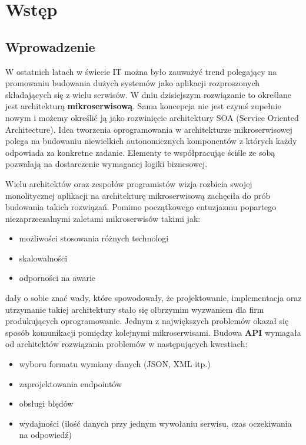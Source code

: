 \chapter{Wstęp}
\section{Wprowadzenie}
W ostatnich latach w świecie IT można było zauważyć trend polegający na promowaniu budowania dużych systemów jako aplikacji rozproszonych składających się z wielu serwisów. W dniu dzisiejszym rozwiązanie to określane jest architekturą \textbf{mikroserwisową}. Sama koncepcja nie jest 
czymś zupełnie nowym i możemy określić ją jako rozwinięcie architektury SOA (Service Oriented Architecture). Idea tworzenia oprogramowania w architekturze mikroserwisowej polega na budowaniu niewielkich autonomicznych komponentów z których każdy odpowiada za konkretne zadanie. Elementy te współpracując ściśle ze sobą pozwalają na dostarczenie wymaganej logiki biznesowej. \par Wielu architektów oraz zespołów programistów wizja rozbicia swojej monolitycznej aplikacji na architekturę mikroserwisową zachęciła do prób budowania takich rozwiązań. Pomimo początkowego entuzjazmu popartego niezaprzeczalnymi zaletami mikroserwisów takimi jak:
\begin{itemize}
    \item możliwości stosowania różnych technologi
    \item skalowalności
    \item odporności na awarie
\end{itemize}
dały o sobie znać wady, które spowodowały, że projektowanie, implementacja oraz utrzymanie takiej architektury stało się olbrzymim wyzwaniem dla firm produkujących oprogramowanie. Jednym z największych problemów okazał się sposób komunikacji pomiędzy kolejnymi mikroserwisami. Budowa \textbf{API} wymagała od architektów rozwiązania problemów w następujących kwestiach:
\begin{itemize}
    \item wyboru formatu wymiany danych (JSON, XML itp.)
    \item zaprojektowania endpointów
    \item obsługi błędów
    \item wydajności (ilość danych przy jednym wywołaniu serwisu, czas oczekiwania na odpowiedź)
\end{itemize}
